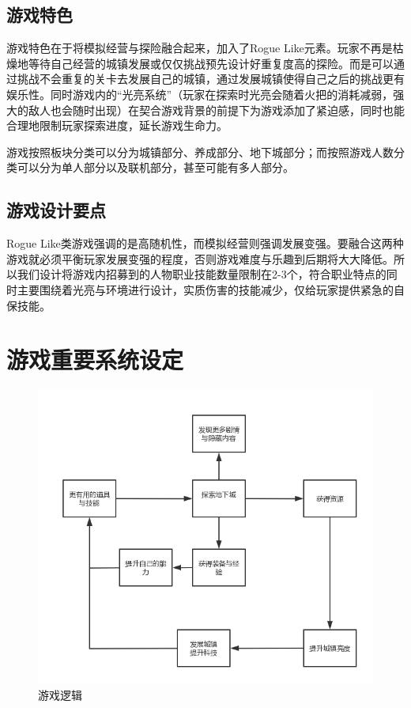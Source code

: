 \documentclass[UTF8,AutoFakeBold=1,AutoFakeSlant,zihao=-4]{cucthesis}
\begin{document}
\subsection{游戏特色}
游戏特色在于将模拟经营与探险融合起来，加入了Rogue Like元素。玩家不再是枯燥地等待自己经营的城镇发展或仅仅挑战预先设计好重复度高的探险。而是可以通过挑战不会重复的关卡去发展自己的城镇，通过发展城镇使得自己之后的挑战更有娱乐性。同时游戏内的“光亮系统”（玩家在探索时光亮会随着火把的消耗减弱，强大的敌人也会随时出现）在契合游戏背景的前提下为游戏添加了紧迫感，同时也能合理地限制玩家探索进度，延长游戏生命力。

游戏按照板块分类可以分为城镇部分、养成部分、地下城部分；而按照游戏人数分类可以分为单人部分以及联机部分，甚至可能有多人部分。


\subsection{游戏设计要点}
Rogue Like类游戏强调的是高随机性，而模拟经营则强调发展变强。要融合这两种游戏就必须平衡玩家发展变强的程度，否则游戏难度与乐趣到后期将大大降低。所以我们设计将游戏内招募到的人物职业技能数量限制在2-3个，符合职业特点的同时主要围绕着光亮与环境进行设计，实质伤害的技能减少，仅给玩家提供紧急的自保技能。


\section{游戏重要系统设定}

\begin{figure}[ht]
    \centering
    \includegraphics[scale=0.5]{imgs/游戏逻辑.png}
    \caption{游戏逻辑}
\end{figure}
\end{document}
